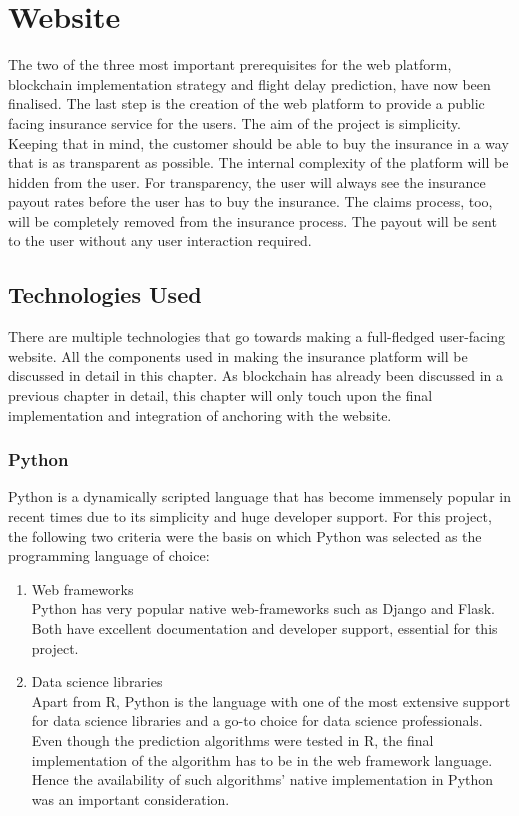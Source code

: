 \chapter{Website}

The two of the three most important prerequisites for the web platform, blockchain implementation strategy and flight delay prediction, have now been finalised. The last step is the creation of the web platform to provide a public facing insurance service for the users. The aim of the project is simplicity. Keeping that in mind, the customer should be able to buy the insurance in a way that is as transparent as possible. The internal complexity of the platform will be hidden from the user. For transparency, the user will always see the insurance payout rates before the user has to buy the insurance. The claims process, too, will be completely removed from the insurance process. The payout will be sent to the user without any user interaction required.

\section{Technologies Used}
There are multiple technologies that go towards making a full-fledged user-facing website. All the components used in making the insurance platform will be discussed in detail in this chapter. As blockchain has already been discussed in a previous chapter in detail, this chapter will only touch upon the final implementation and integration of anchoring with the website.

\subsection{Python}
Python is a dynamically scripted language that has become immensely popular in recent times due to its simplicity and huge developer support. For this project, the following two criteria were the basis on which Python was selected as the programming language of choice:
\begin{enumerate}
    \item Web frameworks
    \\Python has very popular native web-frameworks such as Django and Flask. Both have excellent documentation and developer support, essential for this project.
    \item Data science libraries
    \\ Apart from R, Python is the language with one of the most extensive support for data science libraries and a go-to choice for data science professionals. Even though the prediction algorithms were tested in R, the final implementation of the algorithm has to be in the web framework language. Hence the availability of such algorithms' native implementation in Python was an important consideration.
\end{enumerate}

